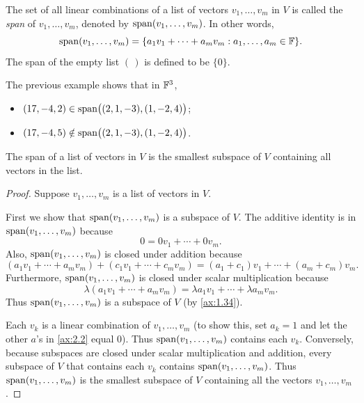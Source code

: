 \begin{definition}[Span]\label{ax:2.4}
The set of all linear combinations of a list of vectors $v_1,\dots,v_m$ in $V$
is called the \emph{span} of $v_1,\dots,v_m$, denoted by
$\operatorname{span}(v_1,\dots,v_m)$. In other words,
\[ \operatorname{span}(v_1,\dots,v_m) = \{a_1v_1+\cdots+a_mv_m : a_1,\dots,a_m\in\mathbb{F}\}. \]
The span of the empty list $(\,)$ is defined to be $\{0\}$.
\end{definition}

\begin{example}[Span]\label{ax:2.5}
The previous example shows that in $\mathbb{F}^3$,
\begin{itemize}
\item $(17,-4,2)\in\operatorname{span}\bigl((2,1,-3),(1,-2,4)\bigr)$;
\item $(17,-4,5)\notin\operatorname{span}\bigl((2,1,-3),(1,-2,4)\bigr)$.
\end{itemize}
\end{example}

\begin{result}\label{ax:2.6}
The span of a list of vectors in $V$ is the smallest subspace of $V$
containing all vectors in the list.
\end{result}

\begin{proof}
Suppose $v_1,\dots,v_m$ is a list of vectors in $V$.

%
First we show that $\operatorname{span}(v_1,\dots,v_m)$ is a subspace of $V$. The additive
identity is in $\operatorname{span}(v_1,\dots,v_m)$ because
\[ 0 = 0v_1+\cdots+0v_m. \]
Also, $\operatorname{span}(v_1,\dots,v_m)$ is closed under addition because
\[ (a_1v_1+\cdots+a_mv_m)+(c_1v_1+\cdots+c_mv_m)
   = (a_1+c_1)v_1+\cdots+(a_m+c_m)v_m. \]
Furthermore, $\operatorname{span}(v_1,\dots,v_m)$ is closed under scalar multiplication
because
\[ \lambda(a_1v_1+\cdots+a_mv_m) = \lambda a_1v_1+\cdots+\lambda a_mv_m. \]
Thus $\operatorname{span}(v_1,\dots,v_m)$ is a subspace of $V$ (by \ref{ax:1.34}).

Each $v_k$ is a linear combination of $v_1,\dots,v_m$ (to show this, set
$a_k=1$ and let the other $a$'s in \ref{ax:2.2} equal $0$). Thus
$\operatorname{span}(v_1,\dots,v_m)$ contains each $v_k$. Conversely, because subspaces are
closed under scalar multiplication and addition, every subspace of $V$ that
contains each $v_k$ contains $\operatorname{span}(v_1,\dots,v_m)$. Thus $\operatorname{span}(v_1,\dots,v_m)$
is the smallest subspace of $V$ containing all the vectors $v_1,\dots,v_m$.
\end{proof}

